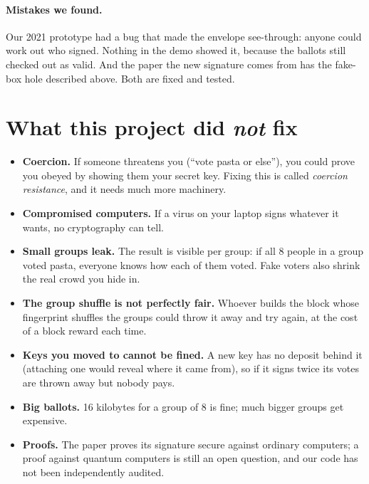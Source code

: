 \documentclass[11pt,a4paper]{article}
\begin{document}
\paragraph{Mistakes we found.} Our 2021 prototype had a bug that made the
envelope see-through: anyone could work out who signed. Nothing in the
demo showed it, because the ballots still checked out as valid. And the
paper the new signature comes from has the fake-box hole described above.
Both are fixed and tested.

\section{What this project did \emph{not} fix}

\begin{itemize}[leftmargin=*]
  \item \textbf{Coercion.} If someone threatens you (``vote pasta or
        else''), you could prove you obeyed by showing them your secret
        key. Fixing this is called \emph{coercion resistance}, and it needs
        much more machinery.
  \item \textbf{Compromised computers.} If a virus on your laptop signs
        whatever it wants, no cryptography can tell.
  \item \textbf{Small groups leak.} The result is visible per group: if all
        8 people in a group voted pasta, everyone knows how each of them
        voted. Fake voters also shrink the real crowd you hide in.
  \item \textbf{The group shuffle is not perfectly fair.} Whoever builds
        the block whose fingerprint shuffles the groups could throw it away
        and try again, at the cost of a block reward each time.
  \item \textbf{Keys you moved to cannot be fined.} A new key has no
        deposit behind it (attaching one would reveal where it came from),
        so if it signs twice its votes are thrown away but nobody pays.
  \item \textbf{Big ballots.} 16 kilobytes for a group of 8 is fine; much
        bigger groups get expensive.
  \item \textbf{Proofs.} The paper proves its signature secure against
        ordinary computers; a proof against quantum computers is still an
        open question, and our code has not been independently audited.
\end{itemize}
\end{document}
